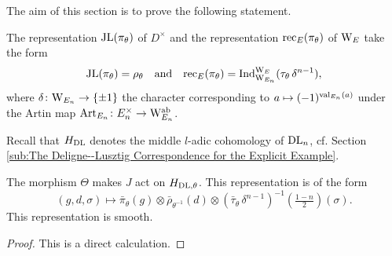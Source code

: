 \documentclass[../main.tex]{subfiles}
\begin{document}
The aim of this section is to prove the following statement.
\begin{thm}\label{thm:MainRes1}
  The representation $\mathrm{JL}(\pi_\theta)$ of $D^\times$ and the representation
  $\mathrm{rec}_E(\pi_\theta)$ of $\mathrm W_E$ take the form
  \begin{equation*}
    \mathrm{JL}(\pi_\theta) = \rho_{\theta}
    \quad \text{and} \quad \mathrm{rec}_E(\pi_\theta) = \mathrm{Ind}_{\mathrm W_{E_n}}^{\mathrm W_E} 
    (\tau_\theta \, \delta^{n-1}),
  \end{equation*}
  where $\delta\colon \mathrm W_{E_n} \to \{\pm 1\}$ the character corresponding to
  $a \mapsto (-1)^{\mathrm{val}_{E_n}(a)}$ under the Artin map $\mathrm{Art}_{E_n}\colon
  E_n^\times \to \mathrm W_{E_n}^{\mathrm{ab}}$. 
\end{thm}


Recall that $H_{\mathrm{DL}}$ denotes the middle $l$-adic cohomology of 
$\mathrm{DL}_n$, cf. Section \ref{sub:The Deligne--Lusztig Correspondence for the
Explicit Example}.
\begin{lem}
  The morphism $\Theta$ makes $J$ act on ${H}_{\mathrm{DL},\theta}$. This representation is 
  of the form 
  \begin{equation*}
    (g,d,\sigma) \mapsto \bar \pi_\theta(g) \otimes \bar \rho_{\theta^{-1}}(d)
    \otimes \left(\bar \tau_\theta \, \delta^{n-1}\right)^{-1}(\tfrac{1-n}2)(\sigma).
  \end{equation*}
  This representation is smooth.
\begin{proof}
  This is a direct calculation.
\end{proof}
\end{lem}
\end{document}
